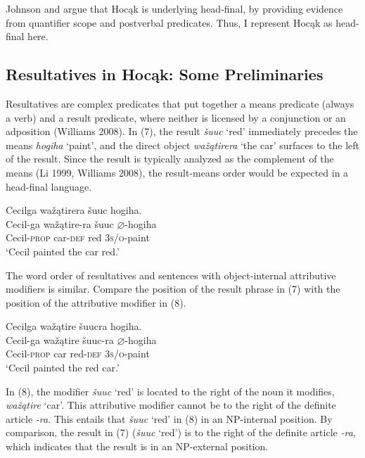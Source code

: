 \documentclass[output=paper]{LSP/langsci}
\begin{document}
Johnson and \citet{Rosen2014} argue that Hocąk is underlying head-final, by providing evidence from quantifier scope and postverbal predicates. Thus, I represent Hocąk as head-final here.

\subsection{Resultatives in Hocąk: Some Preliminaries}

Resultatives are complex predicates that put together a means predicate (always a verb) and a result predicate, where neither is licensed by a conjunction or an adposition (Williams 2008). In (7), the result \textit{šuuc} `red' immediately precedes the means \textit{hogiha} `paint', and the direct object \textit{wažątirera} `the car' surfaces to the left of the result. Since the result is typically analyzed as the complement of the means (Li 1999, Williams 2008), the result-means order would be expected in a head-final language.

\begin{exe}

\ex \glll Cecilga wažątirera šuuc hogiha. \\
Cecil-ga  wažątire-ra šuuc {$\varnothing$}-hogiha \\
Cecil-\textsc{prop} car-\textsc{def} red \textsc{3s/o}-paint\\
\glt `Cecil painted the car red.'

\end{exe}

The word order of resultatives and sentences with object-internal attributive modifiers is similar. Compare the position of the result phrase in (7) with the position of the attributive modifier in (8).

\begin{exe}

\ex \glll Cecilga wažątire šuucra hogiha. \\
Cecil-ga  wažątire šuuc-ra  {$\varnothing$}-hogiha\\
Cecil-\textsc{prop} car red-\textsc{def}  \textsc{3s/o}-paint\\
\glt `Cecil painted the red car.'

\end{exe}

In (8), the modifier \textit{šuuc} `red' is located to the right of the noun it modifies, \textit{wažątire} `car'. This attributive modifier cannot be to the right of the definite article \textit{-ra}. This entails that \textit{šuuc} `red' in (8) in an NP-internal position. By comparison, the result in (7) (\textit{šuuc} `red') is to the right of the definite article \textit{-ra}, which indicates that the result is in an NP-external position.
\end{document}
